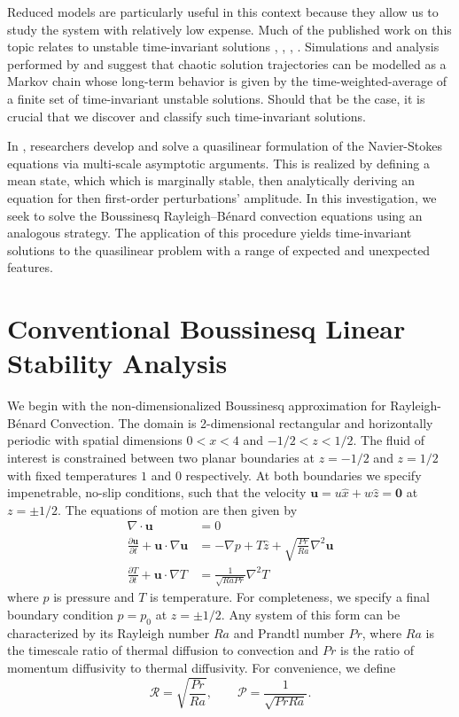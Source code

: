 \documentclass[reprint,amsmath,amssymb,aps]{revtex4-1}
\begin{document}
Reduced models are particularly useful in this context because they allow us to study the system with relatively low expense. 
Much of the published work on this topic relates to unstable time-invariant solutions \cite{Waleffe}, \cite{Sondak}, \cite{Wen}, \cite{chini_cells}. 
Simulations and analysis performed by \cite{Yalniz} and \cite{Cvitanovic} suggest that chaotic solution trajectories can be modelled as a Markov chain whose long-term behavior is given by the time-weighted-average of a finite set of time-invariant unstable solutions. Should that be the case, it is crucial that we discover and classify such time-invariant solutions.

In \cite{Chini_sw}, researchers develop and solve a quasilinear formulation of the Navier-Stokes equations via multi-scale asymptotic arguments. This is realized by defining a mean state, which which is marginally stable, then analytically deriving an equation for then first-order perturbations' amplitude. 
In this investigation, we seek to solve the Boussinesq Rayleigh–Bénard convection equations using an analogous strategy. 
The application of this procedure yields time-invariant solutions to the quasilinear problem with a range of expected and unexpected features. 

\section{Conventional Boussinesq Linear Stability Analysis}\label{sec:boussinesq}
We begin with the non-dimensionalized Boussinesq approximation for Rayleigh-Bénard Convection. 
The domain is 2-dimensional rectangular and horizontally periodic with spatial dimensions $0 < x < 4$ and $-1/2 < z < 1/2$. 
The fluid of interest is constrained between two planar boundaries at $z = -1/2$ and $z = 1/2$ with fixed temperatures $1$ and $0$ respectively. 
At both boundaries we specify impenetrable, no-slip conditions, such that the velocity $\mathbf{u} = u \hat{x} + w \hat{z} = \mathbf{0}$ at $z = \pm 1/2$. 
The equations of motion are then given by
\begin{align}
    \nabla \cdot \mathbf{u} &= 0 \label{EQ:motion1}\\
    \frac{\partial \mathbf{u}}{\partial t} + \mathbf{u} \cdot \nabla \mathbf{u} &= - \nabla p + T \hat{z} + \sqrt{\frac{Pr}{Ra}} \nabla^2 \mathbf{u} \label{EQ:motion2}\\
    \frac{\partial T}{\partial t} + \mathbf{u} \cdot \nabla T &= \frac{1}{\sqrt{RaPr}} \nabla^2 T \label{EQ:motion3}
\end{align}
where $p$ is pressure and $T$ is temperature. 
For completeness, we specify a final boundary condition $p = p_0$ at $z = \pm 1/2$. 
Any system of this form can be characterized by its Rayleigh number $Ra$ and Prandtl number $Pr$, where $Ra$ is the timescale ratio of thermal diffusion to convection and $Pr$ is the ratio of momentum diffusivity to thermal diffusivity.  
For convenience, we define 
\begin{equation}
\mathcal{R} = \sqrt{\frac{Pr}{Ra}}, \qquad \mathcal{P} = \frac{1}{\sqrt{Pr Ra}}.
\end{equation}
\end{document}
